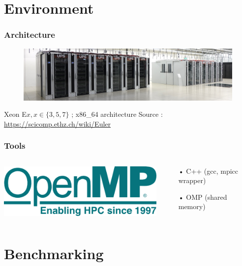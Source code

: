 \documentclass{beamer}
\begin{document}
\section{Environment}
\begin{frame}
\frametitle{Architecture}
\begin{figure}
\includegraphics[scale=0.4]{EULER.jpg}
\end{figure}


\vspace{.5 cm}

Xeon E$x, x\in\{3, 5, 7\}$ ; x86\_64 architecture
\vfill
{
\tiny
Source : 
\url{https://scicomp.ethz.ch/wiki/Euler}
}
\end{frame}
\begin{frame}
\frametitle{Tools}
\begin{columns}
\begin{column}{.4\linewidth}
\includegraphics[scale=.1]{OPENMP.png}
\end{column}

\begin{column}{.6\linewidth}
\begin{itemize}
\item[•] C++ (gcc, mpicc wrapper)
\item[•] OMP (shared memory)
\end{itemize}
\end{column}
\end{columns}

\end{frame}


\section{Benchmarking}
\end{document}
